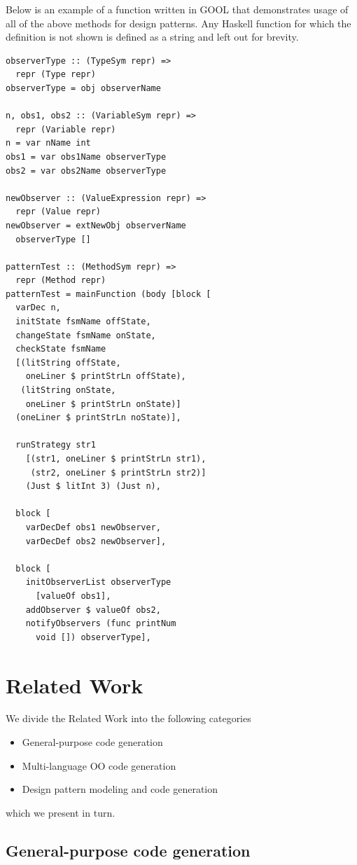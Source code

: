 \documentclass[sigplan,review,anonymous,prologue,dvipsnames]{acmart}
\begin{document}
Below is an example of a function written in GOOL that demonstrates usage of 
all of the above methods for design patterns. Any Haskell function for which 
the definition is not shown is defined as a string and left out for brevity.
\begin{lstlisting}
observerType :: (TypeSym repr) => 
  repr (Type repr)
observerType = obj observerName

n, obs1, obs2 :: (VariableSym repr) => 
  repr (Variable repr)
n = var nName int
obs1 = var obs1Name observerType
obs2 = var obs2Name observerType

newObserver :: (ValueExpression repr) => 
  repr (Value repr)
newObserver = extNewObj observerName 
  observerType []

patternTest :: (MethodSym repr) => 
  repr (Method repr)
patternTest = mainFunction (body [block [
  varDec n,
  initState fsmName offState, 
  changeState fsmName onState,
  checkState fsmName 
  [(litString offState, 
    oneLiner $ printStrLn offState), 
   (litString onState, 
    oneLiner $ printStrLn onState)] 
  (oneLiner $ printStrLn noState)],

  runStrategy str1
    [(str1, oneLiner $ printStrLn str1), 
     (str2, oneLiner $ printStrLn str2)]
    (Just $ litInt 3) (Just n),

  block [
    varDecDef obs1 newObserver, 
    varDecDef obs2 newObserver],

  block [
    initObserverList observerType 
      [valueOf obs1], 
    addObserver $ valueOf obs2,
    notifyObservers (func printNum 
      void []) observerType],
\end{lstlisting}

\section{Related Work} \label{sec:related}

We divide the Related Work into the following categories
\begin{itemize}
\item General-purpose code generation
\item Multi-language OO code generation
\item Design pattern modeling and code generation
\end{itemize}
which we present in turn.

\subsection{General-purpose code generation}
\end{document}
